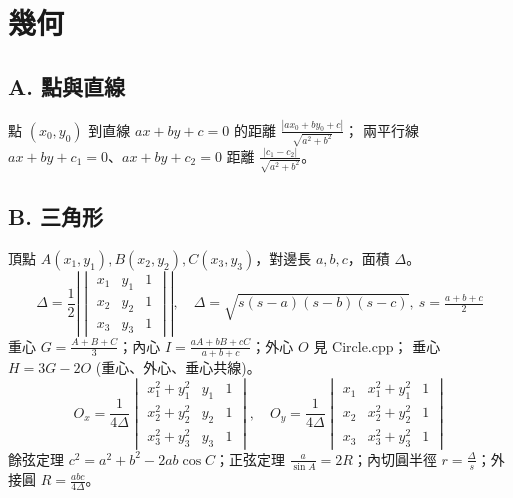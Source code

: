 \documentclass[portrait, 8pt, a4paper, oneside, twocolumn]{extarticle}
\begin{document}



\section{幾何}

\subsection*{A. 點與直線}
點 $(x_0,y_0)$ 到直線 $ax+by+c=0$ 的距離 $\frac{|ax_0+by_0+c|}{\sqrt{a^2+b^2}}$；
兩平行線 $ax+by+c_1=0$、$ax+by+c_2=0$ 距離 $\frac{|c_1-c_2|}{\sqrt{a^2+b^2}}$。

\subsection*{B. 三角形}
頂點 $A(x_1,y_1), B(x_2,y_2), C(x_3,y_3)$，對邊長 $a,b,c$，面積 $\Delta$。
\[
\Delta = \frac{1}{2} \left|\begin{vmatrix} x_1 & y_1 & 1 \\ x_2 & y_2 & 1 \\ x_3 & y_3 & 1 \end{vmatrix}\right|,\quad
\Delta=\sqrt{s(s-a)(s-b)(s-c)},\ s=\tfrac{a+b+c}{2}
\]
重心 $G=\frac{A+B+C}{3}$；內心 $I=\frac{aA+bB+cC}{a+b+c}$；外心 $O$ 見 Circle.cpp；
垂心 $H = 3G - 2O$ (重心、外心、垂心共線)。
\[
O_x = \frac{1}{4\Delta} \begin{vmatrix} x_1^2 + y_1^2 & y_1 & 1 \\ x_2^2 + y_2^2 & y_2 & 1 \\ x_3^2 + y_3^2 & y_3 & 1 \end{vmatrix},\quad
O_y = \frac{1}{4\Delta} \begin{vmatrix} x_1 & x_1^2 + y_1^2 & 1 \\ x_2 & x_2^2 + y_2^2 & 1 \\ x_3 & x_3^2 + y_3^2 & 1 \end{vmatrix}
\]
餘弦定理 $c^2=a^2+b^2-2ab\cos C$；正弦定理 $\frac{a}{\sin A}=2R$；內切圓半徑 $r=\frac{\Delta}{s}$；外接圓 $R=\frac{abc}{4\Delta}$。
\end{document}
